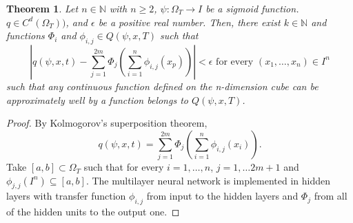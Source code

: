 \documentclass{article}
\newtheorem{theorem}{Theorem}[section]
\begin{document}
\begin{theorem}  \label{nn_proof}
	Let $n \in \mathbb{N}$ with $n \geq 2$, $\psi: \Omega_{T} \rightarrow \textit{I}$ be a sigmoid function. $q \in C^{d}(\Omega_{T}))$, and $\epsilon$ be a positive real number. 
Then, there exist $k \in \mathbb{N}$ and functions $\Phi_{i}$ and $\phi_{i,j} \in Q(\psi,x,T)$ such that
	\begin{equation}
	\left|q(\psi,x,t)-\sum_{j=1}^{2m}\Phi_{j}\left(\sum_{i=1}^{n}\phi_{i,j}(x_p)\right)\right| < \epsilon \text{ for every } (x_1, \dots, x_n) \in I^{n}
	\end{equation}
	such that any continuous function defined on the n-dimension cube can be approximately well by a function belongs to $Q(\psi,x,T)$.
\end{theorem}
\begin{proof}

    By Kolmogorov's superposition theorem,
    \[q(\psi,x,t)=\sum_{j=1}^{2m}\Phi_{j}\left(\sum_{i=1}^{n}\phi_{i,j}(x_i)\right).\]
    Take $[a,b] \subset \Omega_{T}$ such that for every $i=1,\dots,n$, $j=1, \dots 2m+1$ and $\phi_{j,j}(\textit{I}^{n})\subseteq [a,b]$.
    The multilayer neural network is implemented in hidden layers with transfer function $\phi_{i,j}$ from input to the hidden layers and $\Phi_j$ from all of the hidden units to the output one.



\end{proof}
\end{document}
